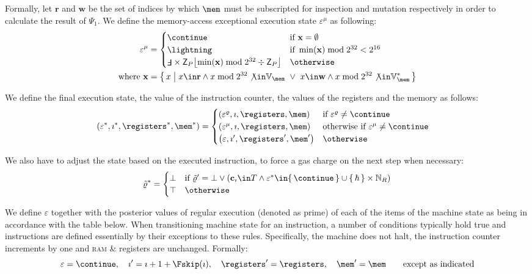 Formally, let $\mathbf{r}$ and $\mathbf{w}$ be the set of indices by which $\mem$ must be subscripted for inspection and mutation respectively in order to calculate the result of $\Psi_1$. We define the memory-access exceptional execution state $\varepsilon^\mu$ as following:
\begin{equation}
  \begin{aligned}
    \varepsilon^{\mu} &= \begin{cases}
      \continue &\when \mathbf{x} = \emptyset \\
      \panic &\when \min(\mathbf{x}) \bmod 2^{32} < 2^{16} \\
      \fault \times \Cpvmpagesize\floor{\min(\mathbf{x}) \bmod 2^{32} \div \Cpvmpagesize} &\otherwise
    \end{cases}\\
    \where \mathbf{x} &= \set{\build{x}{x \in \mathbf{r} \wedge x \bmod 2^{32} \not\in \readable\mem\ \vee\ x \in \mathbf{w} \wedge x \bmod 2^{32} \not\in \writable\mem}}
  \end{aligned}
\end{equation}

We define the final execution state, the value of the instruction counter, the values of the registers and the memory as follows:
\begin{align}
  \tup{\varepsilon^*, \imath^*, \registers^*, \mem^*} &= \begin{cases}
    \tup{\varepsilon^{\gascounter}, \imath, \registers, \mem} &\when \varepsilon^{\gascounter} \neq \continue \\
    \tup{\varepsilon^{\mu}, \imath, \registers, \mem} &\otherwhen \varepsilon^{\mu} \neq \continue \\
    \tup{\varepsilon, \imath', \registers', \mem'} &\otherwise
  \end{cases}
\end{align}

We also have to adjust the state based on the executed instruction, to force a gas charge on the next step when necessary:
\begin{equation}
  \gaschargedflag^* = \begin{cases}
    \bot &\when \gaschargedflag' = \bot \lor (\mathbf{c}_\imath \in T \land \varepsilon^* \in \set{\continue} \cup \set{\host} \times \pvmreg) \\
    \top &\otherwise
  \end{cases}
\end{equation}

We define $\varepsilon$ together with the posterior values of regular execution (denoted as prime) of each of the items of the machine state as being in accordance with the table below. When transitioning machine state for an instruction, a number of conditions typically hold true and instructions are defined essentially by their exceptions to these rules. Specifically, the machine does not halt, the instruction counter increments by one and \textsc{ram} \& registers are unchanged. Formally:
\begin{equation}
  \varepsilon = \continue,\quad \imath' = \imath + 1 + \Fskip(\imath),\quad \registers' = \registers,\quad\mem' = \mem\qquad\text{except as indicated}
\end{equation}

